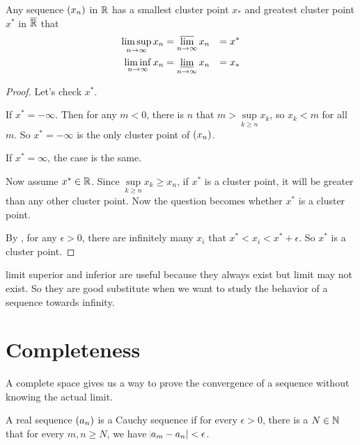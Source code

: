 \begin{theorem}
    Any sequence $\sequence{x_n}$ in $\mathbb{R}$ has a smallest cluster point $x_*$ and greatest cluster point $x^*$ in $\overline{\mathbb{R}}$ that
    \begin{equation}
        \begin{aligned}
            \limsup_{n \rightarrow \infty} x_n &= \varlimsup_{n\rightarrow \infty} x_n &= x^* \\
            \liminf_{n \rightarrow \infty} x_n &= \varliminf_{n\rightarrow \infty} x_n &= x_*
        \end{aligned}
    \end{equation}
\end{theorem}
\begin{proof}
    Let's check $x^*$. 
    
    If $x^* = - \infty$. Then for any $m < 0$, there is $n$ that $m > \underset{k \geq n}{\text{ sup }} x_k$, so $x_k < m$ for all $m$. So $x^* = -\infty$ is the only cluster point of $\sequence{x_n}$.
    
    If $x^* = \infty$, the case is the same.
        
    Now assume $x^* \in \mathbb{R}$. Since $\underset{k \geq n}{\text{ sup }} x_k \geq x_n$, if $x^*$ is a cluster point, it will be greater than any other cluster point. Now the question becomes whether $x^*$ is a cluster point. 
    
    By , for any $\epsilon>0$, there are infinitely many $x_i$ that $x^* < x_i < x^* + \epsilon$. So $x^*$ is a cluster point.
\end{proof}

limit superior and inferior are useful because they always exist but limit may not exist. So they are good substitute when we want to study the behavior of a sequence towards infinity.




\section{Completeness}

A complete space gives us a way to prove the convergence of a sequence without knowing the actual limit.

\begin{definition}
    A real sequence $\sequence{a_n}$ is a Cauchy sequence if for every $\epsilon > 0$, there is a $N \in \mathbb{N}$ that for every $m,n \geq N$, we have $\abs{a_m - a_n} < \epsilon$.
\end{definition}

